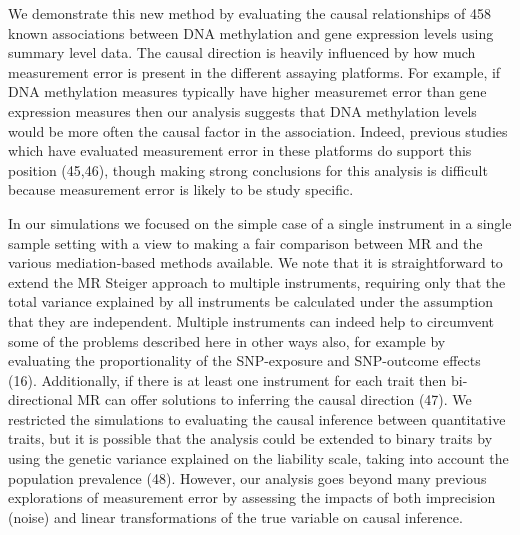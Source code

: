 \documentclass[]{article}
\begin{document}
We demonstrate this new method by evaluating the causal relationships of
458 known associations between DNA methylation and gene expression
levels using summary level data. The causal direction is heavily
influenced by how much measurement error is present in the different
assaying platforms. For example, if DNA methylation measures typically
have higher measuremet error than gene expression measures then our
analysis suggests that DNA methylation levels would be more often the
causal factor in the association. Indeed, previous studies which have
evaluated measurement error in these platforms do support this position
(45,46), though making strong conclusions for this analysis is difficult
because measurement error is likely to be study specific.

In our simulations we focused on the simple case of a single instrument
in a single sample setting with a view to making a fair comparison
between MR and the various mediation-based methods available. We note
that it is straightforward to extend the MR Steiger approach to multiple
instruments, requiring only that the total variance explained by all
instruments be calculated under the assumption that they are
independent. Multiple instruments can indeed help to circumvent some of
the problems described here in other ways also, for example by
evaluating the proportionality of the SNP-exposure and SNP-outcome
effects (16). Additionally, if there is at least one instrument for each
trait then bi-directional MR can offer solutions to inferring the causal
direction (47). We restricted the simulations to evaluating the causal
inference between quantitative traits, but it is possible that the
analysis could be extended to binary traits by using the genetic
variance explained on the liability scale, taking into account the
population prevalence (48). However, our analysis goes beyond many
previous explorations of measurement error by assessing the impacts of
both imprecision (noise) and linear transformations of the true variable
on causal inference.
\end{document}
